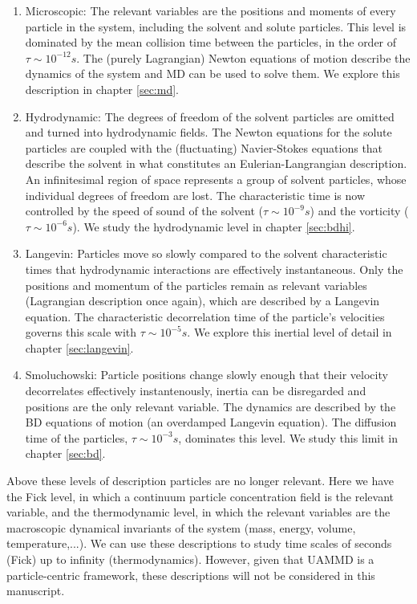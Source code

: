 \documentclass[ twoside,openright,titlepage,numbers=noenddot,%
headinclude,footinclude,cleardoublepage=empty,abstract=on,
BCOR=5mm,paper=a4,fontsize=11pt, dvipsnames
]{scrreprt}
\newcommand{\uammd}{\gls{UAMMD}\xspace}
\begin{document}
\begin{enumerate}
\item Microscopic: The relevant variables are the positions and moments of every particle in the system, including the solvent and solute particles. This level is dominated by the mean collision time between the particles, in the order of $\tau \sim 10^{-12} s$. The (purely Lagrangian) Newton equations of motion describe the dynamics of the system and \gls{MD} can be used to solve them. We explore this description in chapter \ref{sec:md}.
\item Hydrodynamic: The degrees of freedom of the solvent particles are omitted and turned into hydrodynamic fields. The Newton equations for the solute particles are coupled with the (fluctuating) Navier-Stokes equations that describe the solvent in what constitutes an Eulerian-Langrangian description. An infinitesimal region of space represents a group of solvent particles, whose individual degrees of freedom are lost. The characteristic time is now controlled by the speed of sound of the solvent ($\tau \sim 10^{-9}s$) and the vorticity ($\tau \sim 10^{-6}s$). We study the hydrodynamic level in chapter \ref{sec:bdhi}.
\item Langevin: Particles move so slowly compared to the solvent characteristic times that hydrodynamic interactions are effectively instantaneous. Only the positions and momentum of the particles remain as relevant variables (Lagrangian description once again), which are described by a Langevin equation. The characteristic decorrelation time of the particle's velocities governs this scale with $\tau\sim 10^{-5}s$. We explore this inertial level of detail in chapter \ref{sec:langevin}.
\item Smoluchowski: Particle positions change slowly enough that their velocity decorrelates effectively instantenously, inertia can be disregarded and positions are the only relevant variable. The dynamics are described by the \gls{BD} equations of motion (an overdamped Langevin equation). The diffusion time of the particles, $\tau \sim 10^{-3} s$, dominates this level. We study this limit in chapter \ref{sec:bd}.
\end{enumerate}
Above these levels of description particles are no longer relevant. Here we have the Fick level, in which a continuum particle concentration field is the relevant variable, and the thermodynamic level, in which the relevant variables are the macroscopic dynamical invariants of the system (mass, energy, volume, temperature,...). We can use these descriptions to study time scales of seconds (Fick) up to infinity (thermodynamics). However, given that \uammd is a particle-centric framework, these descriptions will not be considered in this manuscript.
\end{document}
